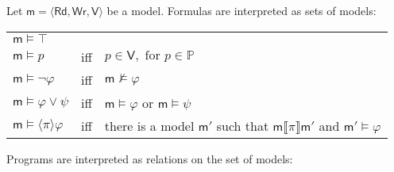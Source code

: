 \documentclass{llncs}
\newcommand{\modl}{\mathsf m}
\newcommand{\readable}[1]{\mathtt{r}_{#1}}
\newcommand{\readset}{\mathsf{Rd}}
\newcommand{\valuset}{\mathsf{V}}
\newcommand{\writable}[1]{\mathtt{w}_{#1}}
\newcommand{\writeset}{\mathsf{Wr}}
\newcommand{\intPgm}[1]{\llbracket #1 \rrbracket}
\newcommand{\ldia}[1]{ \big\langle #1 \big\rangle}
\renewcommand{\phi}{\varphi}
\newcommand{\propset}{\mathbb P}
\newcommand{\tuple}[1]{ \langle #1 \rangle}
\begin{document}
Let $\modl = \tuple{\readset,\writeset,\valuset}$ be a model. 
Formulas are interpreted as sets of models: 
\begin{center}\begin{tabular}{lll}
$\modl \models \top$
\\
$\modl \models p $ & iff & $p \in \valuset, \text{ for } p \in \propset$
\\
$\modl \models \lnot \phi $ & iff & $\modl \not \models \phi $ 
\\
$\modl \models \phi \lor \psi$ & iff & $\modl \models \phi $ or $\modl \models \psi$ 
\\
$\modl \models \ldia \pi \phi $ & iff & there is a model $\modl'$ such that $\modl \intPgm{ \pi } \modl' $ and $\modl' \models \phi$
\end{tabular}\end{center}
Programs are interpreted as relations on the set of models: 
\end{document}
